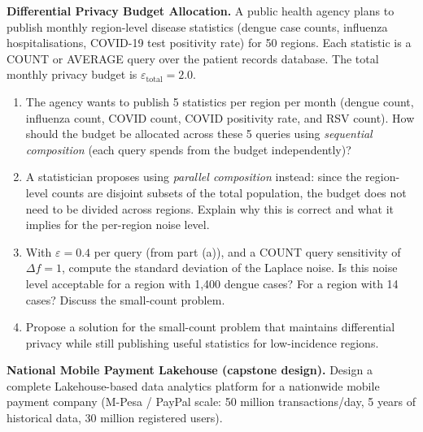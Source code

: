 \ap \textbf{Differential Privacy Budget Allocation.}
A public health agency plans to publish monthly region-level disease
statistics (dengue case counts, influenza hospitalisations, COVID-19 test
positivity rate) for 50 regions. Each statistic is a COUNT or AVERAGE
query over the patient records database. The total monthly privacy budget
is $\varepsilon_{\text{total}} = 2.0$.
\begin{enumerate}[label=(\alph*)]
  \item The agency wants to publish 5 statistics per region per month
        (dengue count, influenza count, COVID count, COVID positivity
        rate, and RSV count). How should the budget be allocated across
        these 5 queries using \emph{sequential composition} (each query
        spends from the budget independently)?
  \item A statistician proposes using \emph{parallel composition} instead:
        since the region-level counts are disjoint subsets of the total
        population, the budget does not need to be divided across regions.
        Explain why this is correct and what it implies for the per-region
        noise level.
  \item With $\varepsilon = 0.4$ per query (from part (a)), and a COUNT
        query sensitivity of $\Delta f = 1$, compute the standard deviation
        of the Laplace noise. Is this noise level acceptable for a region
        with 1{,}400 dengue cases? For a region with 14 cases?
        Discuss the small-count problem.
  \item Propose a solution for the small-count problem that maintains
        differential privacy while still publishing useful statistics for
        low-incidence regions.
\end{enumerate}


\dpr \textbf{National Mobile Payment Lakehouse (capstone design).}
Design a complete Lakehouse-based data analytics platform for a nationwide
mobile payment company (M-Pesa / PayPal scale: 50 million transactions/day,
5 years of historical data, 30 million registered users).

